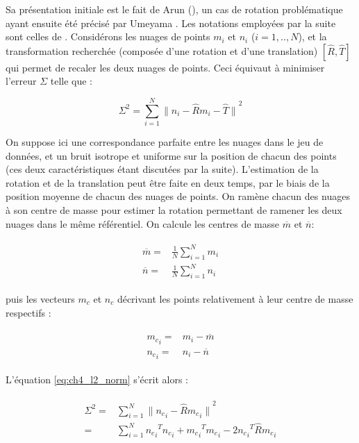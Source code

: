 Sa présentation initiale est le fait de Arun (\cite{Arun1987}), un cas de rotation problématique ayant ensuite été précisé par Umeyama \cite{Umeyama1991}. Les notations employées par la suite sont celles de \cite{Eggert1997}. Considérons les nuages de points ${m_i}$ et ${n_i}$ ($i=1,..,N$), et la transformation recherchée (composée d'une rotation et d'une translation) $[\hat{R}, \hat{T}]$ qui permet de recaler les deux nuages de points. Ceci équivaut à minimiser l'erreur $\Sigma$ telle que :

\begin{equation} \label{eq:ch4_l2_norm}
\Sigma^2 = \sum\limits_{i=1}^{N} {\| n_i - \hat{R} m_i - \hat{T} \|}^2
\end{equation}

On suppose ici une correspondance parfaite entre les nuages dans le jeu de données, et un bruit isotrope et uniforme sur la position de chacun des points (ces deux caractéristiques étant discutées par la suite). L'estimation de la rotation et de la translation peut être faite en deux temps, par le biais de la position moyenne de chacun des nuages de points. On ramène chacun des nuages à son centre de masse pour estimer la rotation permettant de ramener les deux nuages dans le même référentiel. On calcule les centres de masse $\overline{m}$ et $\overline{n}$:

\begin{align}
	\begin{split}
		\overline{m} =& \frac{1}{N} \sum\limits_{i=1}^{N} m_i \\
		\overline{n} =& \frac{1}{N} \sum\limits_{i=1}^{N} n_i
	\end{split}
\end{align}

puis les vecteurs ${m_c}$ et ${n_c}$ décrivant les points relativement à leur centre de masse respectifs :

\begin{align}
	\begin{split}
		{m_c}_i =& m_i - \overline{m} \\
		{n_c}_i =& n_i - \overline{n}
	\end{split}
\end{align}

L'équation \ref{eq:ch4_l2_norm} s'écrit alors :

\begin{align} \label{eq:ch4_eq_to_minimize}
	\begin{split}
		\Sigma^2 =& \sum\limits_{i=1}^{N} {\| {n_c}_i - \hat{R} {m_c}_i \|}^2 \\
		=& \sum\limits_{i=1}^{N} {{n_c}_i}^T {n_c}_i + {{m_c}_i}^T {m_c}_i - 2 {{n_c}_i}^T \hat{R} {m_c}_i
	\end{split}
\end{align}

